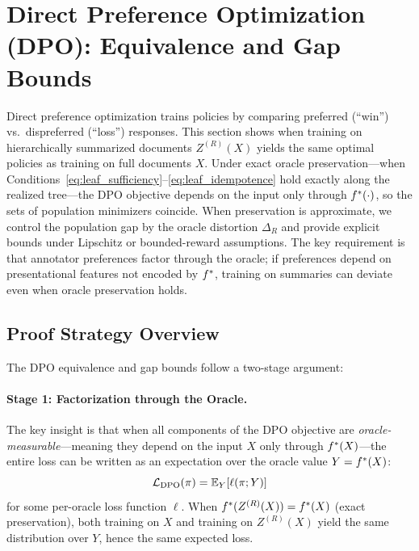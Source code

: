 \section{Direct Preference Optimization (DPO): Equivalence and Gap Bounds}
\label{sec:dpo}

Direct preference optimization trains policies by comparing preferred (``win'') vs.\ dispreferred (``loss'') responses. This section shows when training on hierarchically summarized documents $Z^{(R)}(X)$ yields the same optimal policies as training on full documents $X$. Under exact oracle preservation—when Conditions~\eqref{eq:leaf_sufficiency}--\eqref{eq:leaf_idempotence} hold exactly along the realized tree—the DPO objective depends on the input only through $f^{\ast}(\cdot)$, so the sets of population minimizers coincide. When preservation is approximate, we control the population gap by the oracle distortion $\Delta_R$ and provide explicit bounds under Lipschitz or bounded-reward assumptions. The key requirement is that annotator preferences factor through the oracle; if preferences depend on presentational features not encoded by $f^{\ast}$, training on summaries can deviate even when oracle preservation holds.

\subsection{Proof Strategy Overview}

The DPO equivalence and gap bounds follow a two-stage argument:

\paragraph{Stage 1: Factorization through the Oracle.}
The key insight is that when all components of the DPO objective are \emph{oracle-measurable}---meaning they depend on the input $X$ only through $f^{\ast}(X)$---the entire loss can be written as an expectation over the oracle value $Y = f^{\ast}(X)$:
\[
\mathcal{L}_{\mathrm{DPO}}(\pi) = \mathbb{E}_Y[\ell(\pi; Y)]
\]
for some per-oracle loss function $\ell$. When $f^{\ast}(Z^{(R)}(X)) = f^{\ast}(X)$ (exact preservation), both training on $X$ and training on $Z^{(R)}(X)$ yield the same distribution over $Y$, hence the same expected loss.

